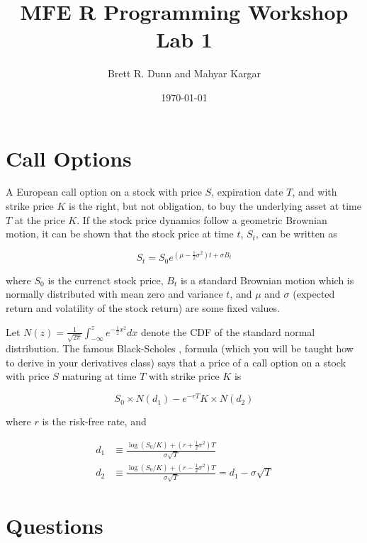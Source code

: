 \documentclass[12pt]{article}
\title{MFE R Programming Workshop Lab 1}
\date{\today}
\author{Brett R. Dunn and Mahyar Kargar}
\begin{document}
\maketitle
\onehalfspacing
\section*{Call Options}
A European call option on a stock with price $S$, expiration date $T$, and with strike price $K$
is the right, but not obligation, to buy the underlying asset at time $T$ at the price $K$. 
If the stock price dynamics follow a geometric Brownian motion, it can be shown that the stock price at time $t$, $S_t$, can be written as

\[
S_t = S_0 e^{\left(\mu-\frac{1}{2} \sigma^2 \right) t + \sigma B_t}
\]

where $S_0$ is the currenct stock price, $B_t$ is a standard Brownian motion which is normally distributed with mean zero and variance $t$, and $\mu$ and
$\sigma$ (expected return and volatility of the stock return) are some fixed values.

Let $N(z) = \frac{1}{\sqrt{2 \pi}} \int_{-\infty}^z e^{-\frac{1}{2}
  x^2}dx$ denote the CDF of the standard normal distribution. The
famous Black-Scholes \citep{black1973pricing,merton1973theory},
formula (which you will be taught how to
derive in your derivatives class) says that a price of a call option
on a stock with price $S$ maturing at time $T$ with strike price $K$ is

\[
S_0 \times N(d_1) - e^{-rT} K \times N(d_2)
\]

where $r$ is the risk-free rate, and

\begin{align*}
  d_1 &\equiv \frac{\log(S_0 / K) + \left(r + \frac{1}{2} \sigma^2 \right)
    T}{\sigma \sqrt{T}} \\
  d_2 &\equiv \frac{\log(S_0 / K) + \left(r - \frac{1}{2} \sigma^2 \right)
    T}{\sigma \sqrt{T}} = d_1-\sigma\sqrt{T}
\end{align*}

\section*{Questions}
\end{document}
